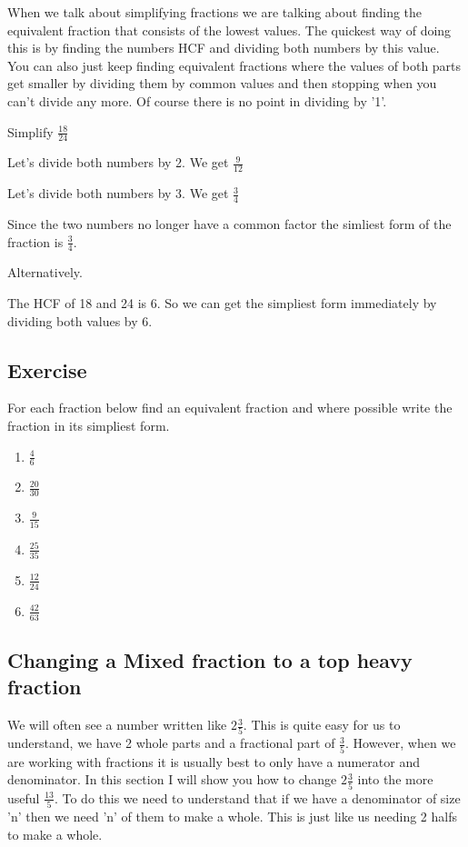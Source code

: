 When we talk about simplifying fractions we are talking about finding the equivalent fraction that consists of the lowest values.  The quickest way of doing this is by finding the numbers HCF and dividing both numbers by this value.  You can also just keep finding equivalent fractions where the values of both parts get smaller by dividing them by common values and then stopping when you can't divide any more.  Of course there is no point in dividing by '1'.

\begin{exmp}
	Simplify $\frac{18}{24}$

	Let's divide both numbers by 2.  We get $\frac{9}{12}$

	Let's divide both numbers by 3.  We get $\frac{3}{4}$

	Since the two numbers no longer have a common factor the simliest form of the fraction is $\frac{3}{4}$.

	Alternatively.

	The HCF of 18 and 24 is 6.  So we can get the simpliest form immediately by dividing both values by 6.
\end{exmp}

\subsection{Exercise}
For each fraction below find an equivalent fraction and where possible write the fraction in its simpliest form.
\begin{multicols}{3}
\begin{enumerate}
	\item $\frac{4}{6}$
	\item $\frac{20}{30}$
	\item $\frac{9}{15}$
	\item $\frac{25}{35}$
	\item $\frac{12}{24}$
	\item $\frac{42}{63}$
\end{enumerate}
\end{multicols}
\subsection{Changing a Mixed fraction to a top heavy fraction}
We will often see a number written like $\displaystyle 2 \frac{3}{5}$.  This is quite easy for us to understand, we have 2 whole parts and a fractional part of $\frac{3}{5}$.  However, when we are working with fractions it is usually best to only have a numerator and denominator.  In this section I will show you how to change $\displaystyle 2 \frac{3}{5}$ into the more useful $\displaystyle \frac{13}{5}$.  To do this we need to understand that if we have a denominator of size 'n' then we need 'n' of them to make a whole.  This is just like us needing 2 halfs to make a whole.

